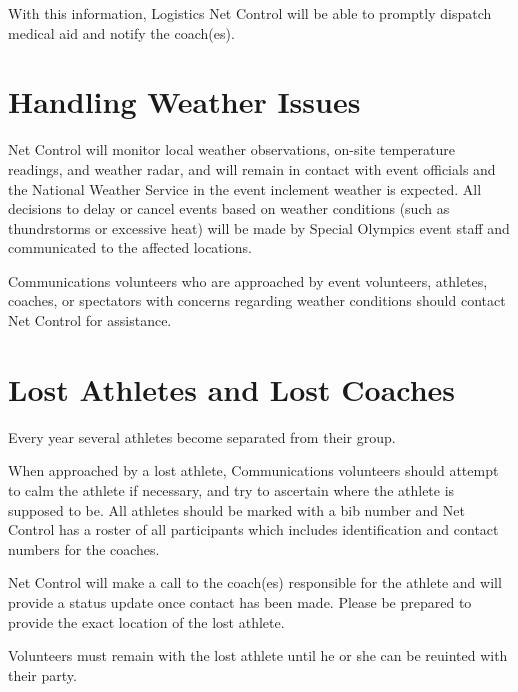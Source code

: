 \documentclass[pdflatex,letterpaper,twoside,12pt]{book}
\begin{document}
With this information, Logistics Net Control will be able to promptly dispatch medical aid and notify the coach(es).


\section{Handling Weather Issues}

Net Control will monitor local weather observations, on-site temperature readings, and weather radar, and will remain in contact with event officials and the National Weather Service in the event inclement weather is expected.  All decisions to delay or cancel events based on weather conditions (such as thundrstorms or excessive heat) will be made by Special Olympics event staff and communicated to the affected locations.

Communications volunteers who are approached by event volunteers, athletes, coaches, or spectators with concerns regarding weather conditions should contact Net Control for assistance.


\section{Lost Athletes and Lost Coaches}

Every year several athletes become separated from their group.

When approached by a lost athlete, Communications volunteers should attempt to calm the athlete if necessary, and try to ascertain where the athlete is supposed to be.  All athletes should be marked with a bib number and Net Control has a roster of all participants which includes identification and contact numbers for the coaches.

Net Control will make a call to the coach(es) responsible for the athlete and will provide a status update once contact has been made.  Please be prepared to provide the exact location of the lost athlete.

Volunteers must remain with the lost athlete until he or she can be reuinted with their party.

\end{document}
